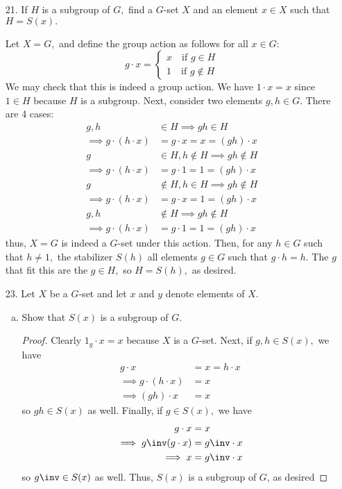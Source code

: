 \documentclass{article}
\begin{document}
\begin{itemize}
		\newpage
	\item[21.] If $H$ is a subgroup of $G,$ find a $G$-set $X$ and an element $x\in X$ such that $H=S(x).$
		\begin{soln}
			Let $X=G,$ and define the group action as follows for all $x\in G:$
			\[g\cdot x = \begin{cases}
					x \quad\text{if } g\in H \\
					1 \quad\text{if } g\not\in H
			\end{cases}\]
			We may check that this is indeed a group action. We have $1\cdot x = x$ since $1\in H$ because $H$ is a subgroup. Next, consider two elements $g, h\in G.$ There are 4 cases:
			\begin{align*}
				\tag{1} g, h &\in H\implies gh\in H \\
				\implies g\cdot (h\cdot x) &= g\cdot x = x = (gh)\cdot x \\
				\tag{2} g&\in H, h\not\in H\implies gh\not\in H \\
				\implies g\cdot (h\cdot x) &= g\cdot 1 = 1 = (gh)\cdot x \\
				\tag{3} g&\not\in H, h\in H\implies gh\not\in H \\
				\implies g\cdot (h\cdot x) &= g\cdot x = 1 = (gh)\cdot x \\
				\tag{4} g, h &\not\in H\implies gh\not\in H \\
				\implies g\cdot (h\cdot x) &= g\cdot 1 = 1 = (gh)\cdot x
			\end{align*} thus, $X=G$ is indeed a $G$-set under this action. Then, for any $h\in G$ such that $h\neq 1,$ the stabilizer $S(h)$ all elements $g\in G$ such that $g\cdot h = h.$ The $g$ that fit this are the $g\in H,$ so $H=S(h),$ as desired.
			
		\end{soln}

	\item[23.] Let $X$ be a $G$-set and let $x$ and $y$ denote elements of $X.$
		\begin{enumerate}[(a)]
			\item Show that $S(x)$ is a subgroup of $G.$
				\begin{proof}
					Clearly $1_g\cdot x = x$ because $X$ is a $G$-set. Next, if $g, h\in S(x),$ we have 
					\begin{align*}
						g\cdot x &= x = h\cdot x\\
						\implies g\cdot(h\cdot x) &= x \\
						\implies (gh)\cdot x &= x
					\end{align*} so $gh\in S(x)$ as well. Finally, if $g\in S(x),$ we have
					\begin{align*}
						g\cdot x &= x \\
						\implies g\inv(g\cdot x) &= g\inv\cdot x \\
						\implies x &= g\inv\cdot x
					\end{align*} so $g\inv\in S(x)$ as well. Thus, $S(x)$ is a subgroup of $G$, as desired
					

\end{proof}
\end{enumerate}
\end{itemize}
\end{document}
